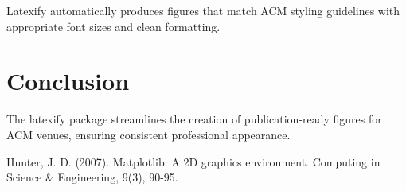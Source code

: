 \documentclass[10pt,twocolumn]{article}
\begin{document}
Latexify automatically produces figures that match ACM styling guidelines with appropriate font sizes and clean formatting.

\section{Conclusion}

The latexify package streamlines the creation of publication-ready figures for ACM venues, ensuring consistent professional appearance.

\begin{thebibliography}{9}
 Hunter, J. D. (2007). Matplotlib: A 2D graphics environment. Computing in Science \& Engineering, 9(3), 90-95.
\end{thebibliography}
\end{document}
